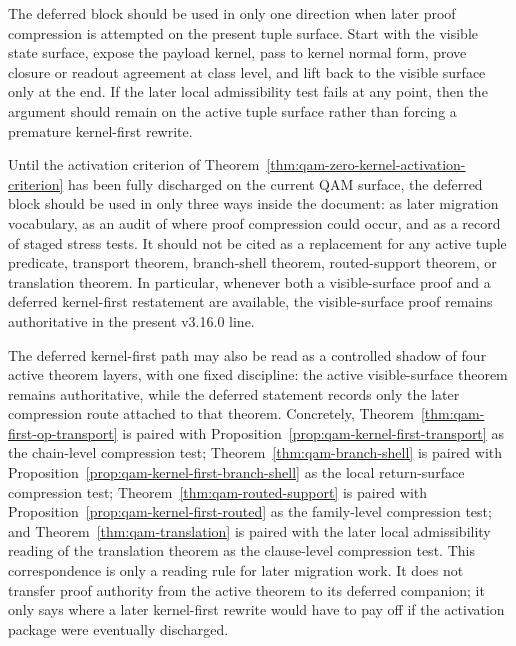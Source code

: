 \begin{remark}\label{rem:qam-zero-kernel-execution-rule}
The deferred block should be used in only one direction when later proof compression is attempted on the present tuple surface. Start with the visible state surface, expose the payload kernel, pass to kernel normal form, prove closure or readout agreement at class level, and lift back to the visible surface only at the end. If the later local admissibility test fails at any point, then the argument should remain on the active tuple surface rather than forcing a premature kernel-first rewrite.
\end{remark}

\begin{remark}\label{rem:qam-zero-kernel-present-use}
Until the activation criterion of Theorem~\ref{thm:qam-zero-kernel-activation-criterion} has been fully discharged on the current QAM surface, the deferred block should be used in only three ways inside the document: as later migration vocabulary, as an audit of where proof compression could occur, and as a record of staged stress tests. It should not be cited as a replacement for any active tuple predicate, transport theorem, branch-shell theorem, routed-support theorem, or translation theorem. In particular, whenever both a visible-surface proof and a deferred kernel-first restatement are available, the visible-surface proof remains authoritative in the present v3.16.0 line.
\end{remark}


\begin{remark}\label{rem:qam-zero-kernel-correspondence}
The deferred kernel-first path may also be read as a controlled shadow of four active theorem layers, with one fixed discipline: the active visible-surface theorem remains authoritative, while the deferred statement records only the later compression route attached to that theorem. Concretely, Theorem~\ref{thm:qam-first-op-transport} is paired with Proposition~\ref{prop:qam-kernel-first-transport} as the chain-level compression test; Theorem~\ref{thm:qam-branch-shell} is paired with Proposition~\ref{prop:qam-kernel-first-branch-shell} as the local return-surface compression test; Theorem~\ref{thm:qam-routed-support} is paired with Proposition~\ref{prop:qam-kernel-first-routed} as the family-level compression test; and Theorem~\ref{thm:qam-translation} is paired with the later local admissibility reading of the translation theorem as the clause-level compression test. This correspondence is only a reading rule for later migration work. It does not transfer proof authority from the active theorem to its deferred companion; it only says where a later kernel-first rewrite would have to pay off if the activation package were eventually discharged.
\end{remark}

